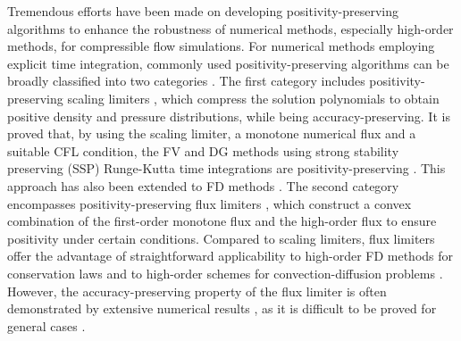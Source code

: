 Tremendous efforts have been made on developing positivity-preserving algorithms to enhance the robustness of numerical methods,
especially high-order methods, for compressible flow simulations.
For numerical methods employing explicit time integration, commonly used positivity-preserving algorithms can be broadly classified into two categories \cite{xu2017bound}.
The first category includes positivity-preserving scaling limiters \cite{zhang2010maximum,zhang2010positivity,wang2012robust,cheng2014positivity,du2022high},
which compress the solution polynomials to obtain positive density and pressure distributions,
while being accuracy-preserving.
It is proved that, by using the scaling limiter,
a monotone numerical flux and a suitable CFL condition,
the FV and DG methods using strong stability preserving (SSP) Runge-Kutta
time integrations are positivity-preserving \cite{zhang2010positivity}.
This approach has also been extended to FD methods \cite{zhang2012positivity,fan2022positivity}.
The second category encompasses positivity-preserving flux limiters \cite{hu2013positivity,christlieb2015high,kuzmin2022bound},
which construct a convex combination of the first-order monotone flux and the high-order flux to ensure positivity under certain conditions. Compared to scaling limiters,
flux limiters offer the advantage of straightforward applicability to high-order FD methods for conservation laws and to high-order schemes
for convection-diffusion problems \cite{xu2017bound}.
However, the accuracy-preserving property of the flux limiter is often demonstrated
by extensive numerical results \cite{xiong2013parametrized},
as it is difficult to be proved for general cases \cite{xu2017bound}.

